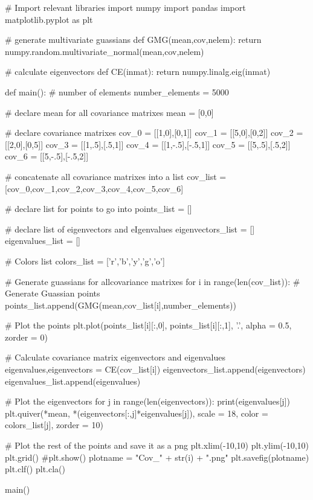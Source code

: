 \documentclass{article}
\begin{document}
\begin{python}
        # Import relevant libraries
        import numpy
        import pandas
        import matplotlib.pyplot as plt

        # generate multivariate guassians
        def GMG(mean,cov,nelem):
            return numpy.random.multivariate_normal(mean,cov,nelem)
        
        # calculate eigenvectors
        def CE(inmat):
            return numpy.linalg.eig(inmat)
        
        def main():
            # number of elements
            number_elements = 5000
        
           # declare mean for all covariance matrixes
            mean = [0,0]
        
            # declare covariance matrixes
            cov_0 = [[1,0],[0,1]]
            cov_1 = [[5,0],[0,2]]
            cov_2 = [[2,0],[0,5]]
            cov_3 = [[1,.5],[.5,1]]
            cov_4 = [[1,-.5],[-.5,1]]
            cov_5 = [[5,.5],[.5,2]]
            cov_6 = [[5,-.5],[-.5,2]]
        
            # concatenate all covariance matrixes into a list
            cov_list = [cov_0,cov_1,cov_2,cov_3,cov_4,cov_5,cov_6]
        
            # declare list for points to go into
            points_list = []
        
            # declare list of eigenvectors and eIgenvalues
            eigenvectors_list = []
            eigenvalues_list = []
        
            # Colors list
            colors_list = ['r','b','y','g','o']
        
            # Generate guassians for allcovariance matrixes
            for i in range(len(cov_list)):
                # Generate Guassian points
                points_list.append(GMG(mean,cov_list[i],number_elements))
                
                # Plot the points
                plt.plot(points_list[i][:,0], points_list[i][:,1], '.', alpha = 0.5, zorder = 0)
                
                # Calculate covariance matrix eigenvectors and eigenvalues
                eigenvalues,eigenvectors = CE(cov_list[i])
                eigenvectors_list.append(eigenvectors)
                eigenvalues_list.append(eigenvalues)
        
                # Plot the eigenvectors
                for j in range(len(eigenvectors)):
                    print(eigenvalues[j])     
                    plt.quiver(*mean, *(eigenvectors[:,j]*eigenvalues[j]), scale = 18, color = colors_list[j], zorder = 10)
                
                # Plot the rest of the points and save it as a png
                plt.xlim(-10,10)
                plt.ylim(-10,10)
                plt.grid()
                #plt.show()
                plotname = "Cov_" + str(i) + ".png"
                plt.savefig(plotname)
                plt.clf()
                plt.cla()
               
        main()

\end{python}
\end{document}
